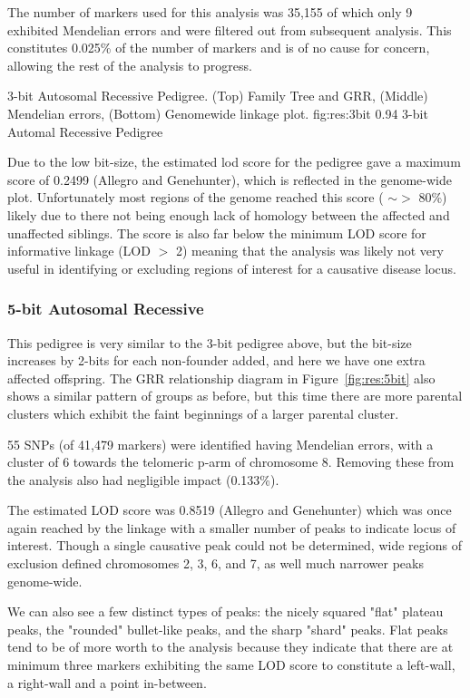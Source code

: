 The number of markers used for this analysis was 35,155 of which only 9 exhibited Mendelian errors and were filtered out from subsequent analysis. This constitutes 0.025\% of the number of markers and is of no cause for concern, allowing the rest of the analysis to progress.

{3-bit Autosomal Recessive Pedigree. (Top) Family Tree and GRR, (Middle) Mendelian errors, (Bottom) Genomewide linkage plot.}
{fig:res:3bit}
{0.94}
{3-bit Automal Recessive Pedigree}

Due to the low bit-size, the estimated lod score for the pedigree gave a maximum score of 0.2499 (Allegro and Genehunter), which is reflected in the genome-wide plot. Unfortunately most regions of the genome reached this score ( $\sim>$ 80\%) likely due to there not being enough lack of homology between the affected and unaffected siblings. The score is also far below the minimum LOD score for informative linkage (LOD $>$ 2) meaning that the analysis was likely not very useful in identifying or excluding regions of interest for a causative disease locus.

\subsubsection*{5-bit Autosomal Recessive}

This pedigree is very similar to the 3-bit pedigree above, but the bit-size increases by 2-bits for each non-founder added, and here we have one extra affected offspring. The GRR relationship diagram in Figure~\ref{fig:res:5bit} also shows a similar pattern of groups as before, but this time there are more parental clusters which exhibit the faint beginnings of a larger parental cluster. 

55 SNPs (of 41,479 markers) were identified having Mendelian errors, with a cluster of 6 towards the telomeric p-arm of chromosome 8. Removing these from the analysis also had negligible impact (0.133\%).

The estimated LOD score was 0.8519 (Allegro and Genehunter) which was once again reached by the linkage with a smaller number of peaks to indicate locus of interest. Though a single causative peak could not be determined, wide regions of exclusion defined chromosomes 2, 3, 6, and 7, as well much narrower peaks genome-wide.

We can also see a few distinct types of peaks: the nicely squared "flat" plateau peaks, the "rounded" bullet-like peaks, and the sharp "shard" peaks. Flat peaks tend to be of more worth to the analysis because they indicate that there are at minimum three markers exhibiting the same LOD score to constitute a left-wall, a right-wall and a point in-between. 

